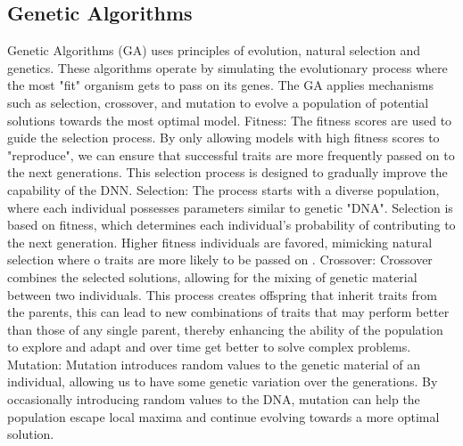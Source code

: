 \documentclass{article}
\begin{document}
\subsection{Genetic Algorithms}
Genetic Algorithms (GA) uses principles of evolution, natural selection and genetics. These algorithms operate by simulating the evolutionary process where the most "fit" organism gets to pass on its genes. The GA applies mechanisms such as selection, crossover, and mutation to evolve a population of potential solutions towards the most optimal model.
\newline
\newline
Fitness:
\newline
The fitness scores are used to guide the selection process. By only allowing models with high fitness scores to "reproduce", we can ensure that successful traits are more frequently passed on to the next generations. This selection process is designed to gradually improve the capability of the DNN. \cite{techniquesandparadigms}
\newline
\newline
Selection:
\newline
The process starts with a diverse population, where each individual possesses parameters similar to genetic "DNA". Selection is based on fitness, which determines each individual's probability of contributing to the next generation. Higher fitness individuals are favored, mimicking natural selection where o traits are more likely to be passed on \cite{techniquesandparadigms}.
\newline
\newline
Crossover:
\newline
Crossover combines the selected solutions, allowing for the mixing of genetic material between two individuals. This process creates offspring that inherit traits from the parents, this can lead to new combinations of traits that may perform better than those of any single parent, thereby enhancing the ability of the population to explore and adapt and over time get better to solve complex problems. \cite{techniquesandparadigms}
\newline
\newline
Mutation:
\newline
Mutation introduces random values to the genetic material of an individual, allowing us to have some genetic variation over the generations. By occasionally introducing random values to the DNA, mutation can help the population escape local maxima and continue evolving towards a more optimal solution. \cite{techniquesandparadigms}
\end{document}

